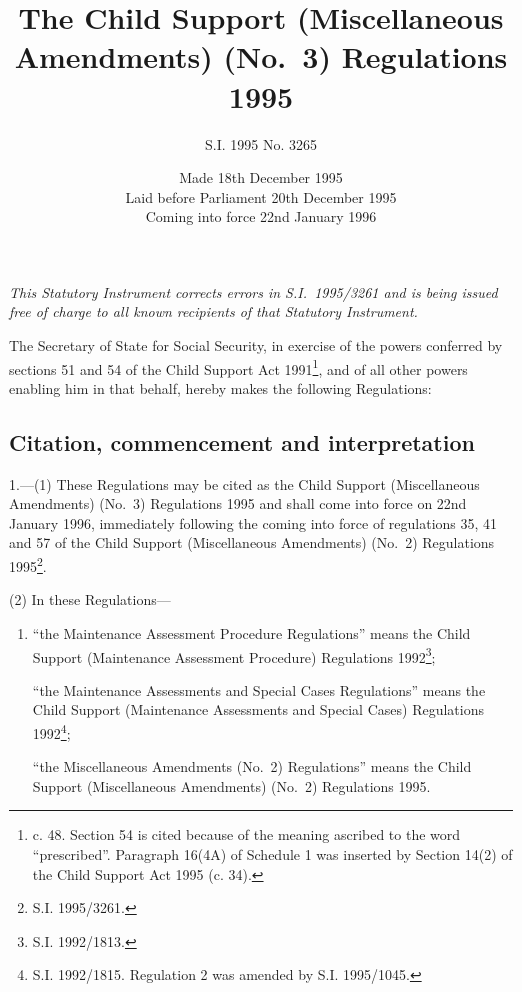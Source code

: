 \documentclass[a4paper]{article}
\title{The Child Support (Miscellaneous Amendments) (No.\ 3) Regulations 1995}
\author{S.I. 1995 No. 3265}
\date{Made 18th December 1995\\Laid before Parliament 20th December 1995\\Coming into force 22nd January 1996
}
\begin{document}
\maketitle

\begin{center}
\small\itshape\noindent 
This Statutory Instrument corrects errors in S.I.\ 1995/3261 and is being issued free of charge to all known recipients of that Statutory Instrument.
\end{center}

\noindent
The Secretary of State for Social Security, in exercise of the powers conferred by sections 51 and 54 of the Child Support Act 1991\footnote{ c. 48. Section 54 is cited because of the meaning ascribed to the word “prescribed”. Paragraph 16(4A) of Schedule 1 was inserted by Section 14(2) of the Child Support Act 1995 (c. 34).}, and of all other powers enabling him in that behalf, hereby makes the following Regulations:

{\sloppy

\tableofcontents

}

\setcounter{secnumdepth}{-2}

\subsection[1. Citation, commencement and interpretation]{Citation, commencement and interpretation}

1.—(1) These Regulations may be cited as the Child Support (Miscellaneous Amendments) (No.\ 3) Regulations 1995 and shall come into force on 22nd January 1996, immediately following the coming into force of regulations 35, 41 and 57 of the Child Support (Miscellaneous Amendments) (No.\ 2) Regulations 1995\footnote{\frenchspacing S.I. 1995/3261.}.

(2) In these Regulations---
\begin{enumerate}\item[]
“the Maintenance Assessment Procedure Regulations” means the Child Support (Maintenance Assessment Procedure) Regulations 1992\footnote{\frenchspacing S.I. 1992/1813.};

“the Maintenance Assessments and Special Cases Regulations” means the Child Support (Maintenance Assessments and Special Cases) Regulations 1992\footnote{\frenchspacing S.I. 1992/1815. Regulation 2 was amended by S.I. 1995/1045.};

“the Miscellaneous Amendments (No.\ 2) Regulations” means the Child Support (Miscellaneous Amendments) (No.\ 2) Regulations 1995.
\end{enumerate}
\end{document}
